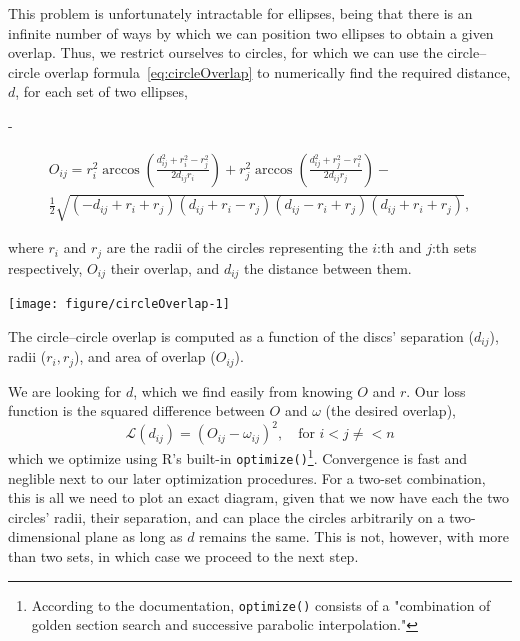 \documentclass[
  oneside,
  openany,
  numbers=noendperiod,
  parskip=half,
  bibliography=totoc
]{scrbook}\usepackage[]{graphicx}\usepackage{xcolor}
\newenvironment{knitrout}{}{} %
\newlength{\overhang}
\newenvironment{fullwidth}{
  \begin{addmargin*}[0em]{-\overhang}
  }{
  \end{addmargin*}
}
\newcommand{\code}[1]{\texttt{#1}}
\begin{document}
This problem is unfortunately intractable for ellipses, being that there is an
infinite number of ways by which we can position two ellipses to obtain a given
overlap. Thus, we restrict ourselves to circles, for which we can use the
circle--circle overlap formula~\eqref{eq:circleOverlap} to numerically find the
required distance, $d$, for each set of two ellipses,
\begin{fullwidth}
\begin{multline}
O_{ij} = r_i^2\arccos\left(\frac{d_{ij}^2 + r_i^2 - r_j^2}{2d_{ij}r_i}\right) +
r_j^2\arccos\left(\frac{d_{ij}^2 + r_j^2 - r_i^2}{2d_{ij}r_j}\right) - \\
\frac{1}{2}\sqrt{(-d_{ij} + r_i + r_j)(d_{ij} + r_i - r_j)(d_{ij} - r_i + r_j)(d_{ij} + r_i + r_j)},
\label{eq:circleOverlap}
\end{multline}
\end{fullwidth}
where $r_i$ and $r_j$ are the radii of the circles representing the $i$:th and
$j$:th sets respectively, $O_{ij}$ their overlap, and $d_{ij}$ the distance
between them.

\begin{marginfigure}
\begin{knitrout}\small
{}\color{fgcolor}

{\centering \texttt{[image: figure/circleOverlap-1]}

}



\end{knitrout}
\caption{The circle--circle overlap is computed as a function of the discs'
separation ($d_{ij}$), radii ($r_i,r_j$), and area of overlap ($O_{ij}$).}
\label{fig:circleCircle}
\end{marginfigure}

We are looking for $d$, which we find easily from knowing $O$ and $r$. Our loss
function is the squared difference between $O$ and $\omega$
(the desired overlap),
\begin{equation}
  \mathcal{L}(d_{ij}) = (O_{ij} - \omega_{ij})^2, \quad \text{for } i <
    j \neq < n
\label{eq:dopt}
\end{equation}
which we optimize using R's built-in \code{optimize()}\footnote{According to the
documentation, \code{optimize()} consists of a "combination of golden section
search and successive parabolic interpolation."}. Convergence is fast and
neglible next to our later optimization procedures. For a two-set
combination, this is all we need to plot an exact diagram, given
that we now have each the two circles' radii, their separation, and
can place the circles arbitrarily on a two-dimensional plane as long
as $d$ remains the same. This is not, however, with more than two sets,
in which case we proceed to the next step.
\end{document}
